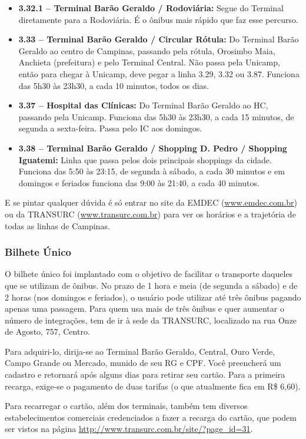 \begin{itemize}
\item  \textbf{3.32.1 -- Terminal Barão Geraldo / Rodoviária:} Segue do Terminal
       diretamente para a Rodoviária. É o ônibus mais rápido que faz esse percurso.

\item  \textbf{3.33 -- Terminal Barão Geraldo / Circular Rótula:} Do Terminal
       Barão Geraldo ao centro de Campinas, passando pela rótula, Orosimbo Maia,
       Anchieta (prefeitura) e pelo Terminal Central. Não passa pela Unicamp, então
       para chegar à Unicamp, deve pegar a linha 3.29, 3.32 ou 3.87. Funciona das
       5h30 às 23h30, a cada 10 minutos, todos os dias.

\item  \textbf{3.37 -- Hospital das Clínicas:} Do Terminal Barão Geraldo ao HC,
       passando pela Unicamp. Funciona das 5h30 às 23h30, a cada 15 minutos, de
       segunda a sexta-feira. Passa pelo IC aos domingos.

\item  \textbf{3.38 -- Terminal Barão Geraldo / Shopping D. Pedro / Shopping
        Iguatemi:} Linha que passa pelos dois principais shoppings da cidade.
       Funciona das 5:50 às 23:15, de segunda à sábado, a cada 30 minutos e em
       domingos e feriados funciona das 9:00 às 21:40, a cada 40 minutos.
\end{itemize}

E se pintar qualquer dúvida é só entrar no site da EMDEC
(\url{www.emdec.com.br}) ou da TRANSURC (\url{www.transurc.com.br}) para ver os
horários e a trajetória de todas as linhas de Campinas.

\subsubsection{Bilhete Único}

O bilhete único foi implantado com o objetivo de facilitar o transporte daqueles
que se utilizam de ônibus. No prazo de 1 hora e meia (de segunda a sábado) e de
2 horas (nos domingos e feriados), o usuário pode utilizar até três ônibus
pagando apenas uma passagem. Para quem usa mais de três ônibus e quer aumentar
o número de integrações, tem de ir à sede da TRANSURC, localizado na rua Onze de
Agosto, 757, Centro.

Para adquiri-lo, dirija-se ao Terminal Barão Geraldo, Central, Ouro Verde, Campo
Grande ou Mercado, munido de seu RG e CPF. Você preencherá um cadastro
e retornará após alguns dias para retirar seu cartão. Para a primeira recarga,
exige-se o pagamento de duas tarifas (o que atualmente fica em R\$ 6,60).

Para recarregar o cartão, além dos terminais, também tem diversos
estabelecimentos comerciais credenciados a fazer a recarga do cartão, que podem
ser vistos na página \url{http://www.transurc.com.br/site/?page_id=31}.
